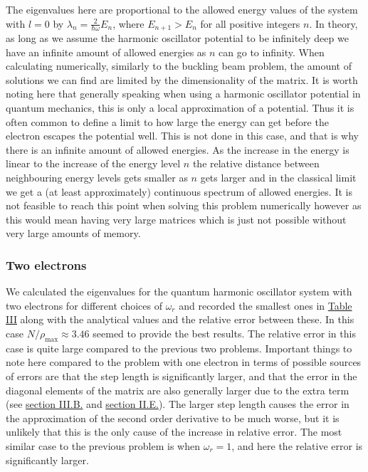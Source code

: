 \documentclass[reprint,english,notitlepage]{revtex4-1}  %
\begin{document}
The eigenvalues here are proportional to the allowed energy values of the system with $l=0$ by $\lambda_n = \frac{2}{\hbar \omega} E_n$, where $E_{n+1} > E_n$ for all positive integers $n$. In theory, as long as we assume the harmonic oscillator potential to be infinitely deep we have an infinite amount of allowed energies as $n$ can go to infinity. When calculating numerically, similarly to the buckling beam problem, the amount of solutions we can find are limited by the dimensionality of the matrix. It is worth noting here that generally speaking when using a harmonic oscillator potential in quantum mechanics, this is only a local approximation of a potential. Thus it is often common to define a limit to how large the energy can get before the electron escapes the potential well. This is not done in this case, and that is why there is an infinite amount of allowed energies. As the increase in the energy is linear to the increase of the energy level $n$ the relative distance between neighbouring energy levels gets smaller as $n$ gets larger and in the classical limit we get a (at least approximately) continuous spectrum of allowed energies. It is not feasible to reach this point when solving this problem numerically however as this would mean having very large matrices which is just not possible without very large amounts of memory. 


\subsubsection{Two electrons} \label{sec:V:b:ii}

We calculated the eigenvalues for the quantum harmonic oscillator system with two electrons for different choices of $\omega_r$ and recorded the smallest ones in \hyperref[table:IV:c:1]{Table III} along with the analytical values and the relative error between these. In this case $N/\rho_\text{max} \approx 3.46$ seemed to provide the best results. The relative error in this case is quite large compared to the previous two problems. Important things to note here compared to the problem with one electron in terms of possible sources of errors are that the step length is significantly larger, and that the error in the diagonal elements of the matrix are also generally larger due to the extra term (see \hyperref[sec:III:b]{section III.B.} and \hyperref[sec:II:e]{section II.E.}). The larger step length causes the error in the approximation of the second order derivative to be much worse, but it is unlikely that this is the only cause of the increase in relative error. The most similar case to the previous problem is when $\omega_r = 1$, and here the relative error is significantly larger.       
\end{document}
